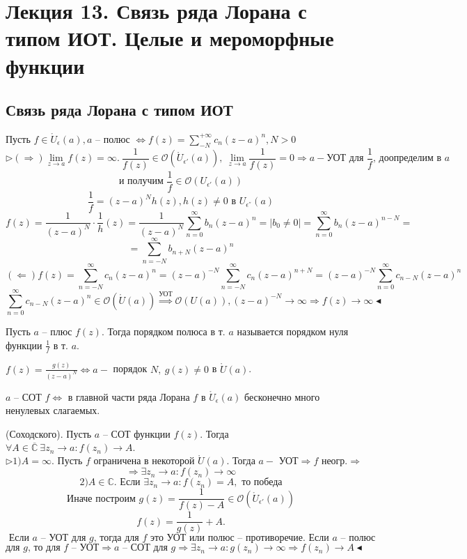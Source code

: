 \section{Лекция 13. Связь ряда Лорана с типом ИОТ. Целые и мероморфные функции}
\subsection{Связь ряда Лорана с типом ИОТ}
 Пусть $f \in \mathring{U}_{\epsilon}(a), a$ -- полюс $\Leftrightarrow f(z) = \sum_{-N}^{+\infty} c_n(z-a)^n, N >0$
\[\triangleright (\Rightarrow) \lim_{z\to a} f(z) = \infty. \ \frac{1}{f(z)} \in \mathcal{O}(\mathring{U}_{\epsilon'}(a)), \ \lim_{z\to a} \frac{1}{f(z)} = 0 \Rightarrow a - \text{УОТ для $\frac{1}{f}$, доопределим в $a$}\]
\[\text{и получим } \frac{1}{f} \in \mathcal{O}(U_{\epsilon'}(a))\]
\[\frac{1}{f} = (z-a)^{N} h(z), h(z) \neq 0 \text{ в } U_{\epsilon^{''}}(a)\]
\[f(z) = \frac{1}{(z-a)^N} \cdot \frac{1}{h}(z) = \frac{1}{(z-a)^N} \sum_{n=0}^\infty b_n (z-a)^n = \left|b_0 \neq 0\right| = \sum_{n=0}^\infty b_n (z-a)^{n-N} =\]
\[=\sum_{n=-N}^\infty b_{n+N} (z-a)^n\]
\[(\Leftarrow) f(z) = \sum_{n=-N}^\infty c_n (z-a)^n = (z-a)^{-N} \sum_{n=-N}^\infty c_n (z-a)^{n+N} = (z-a)^{-N}\sum_{n=0}^\infty c_{n-N}(z-a)^n\]
\[\sum_{n=0}^\infty c_{n-N}(z-a)^n \in \mathcal{O}(\mathring{U}(a)) \overset{\text{УОТ}}{\Rightarrow} \mathcal{O}(U(a)), (z-a)^{-N} \to \infty \Rightarrow f(z) \to \infty \blacktriangleleft\]

 Пусть $a$ -- плюс $f(z)$. Тогда порядком полюса в т. $a$ называется порядком нуля функции $\frac{1}{f}$ в т. $a$.

 $f(z) = \frac{g(z)}{(z-a)^N} \Leftrightarrow a - $ порядок $N, \ g(z) \neq 0 $ в $\mathring{U}(a)$.

 $a$ -- СОТ $f \Leftrightarrow$ в главной части ряда Лорана $f$ в $\mathring{U}_\epsilon(a)$ бесконечно много ненулевых слагаемых.

 (Соходского). Пусть $a$ -- СОТ функции $f(z)$. Тогда $\forall A \in \overline{\mathbb{C}} \ \exists z_n \to a: f(z_n) \to A.$
\[\triangleright 1) A = \infty. \text{ Пусть $f$ ограничена в некоторой $\mathring{U}(a)$. Тогда $a - $ УОТ} \Rightarrow f \text{ неогр.} \Rightarrow\]
\[\Rightarrow \exists z_n \to a : f(z_n) \to \infty\]
\[2) A \in \mathbb{C}. \text{ Если } \exists z_n \to a: f(z_n) = A, \text{ то победа}\]
\[\text{Иначе построим } g(z) = \frac{1}{f(z)-A} \in \mathcal{O}(\mathring{U}_{\epsilon'}(a))\]
\[f(z) = \frac{1}{g(z)} + A.\] 
\[\text{ Если $a$ -- УОТ для $g$, тогда для $f$ это УОТ или полюс -- противоречие. Если $a$ -- полюс}\]
\[\text{для $g$, то для $f$ -- УОТ} \Rightarrow \text{$a$ -- СОТ для $g$} \Rightarrow \exists z_n \to a: g(z_n) \to \infty \Rightarrow f(z_n) \to A \blacktriangleleft\]

